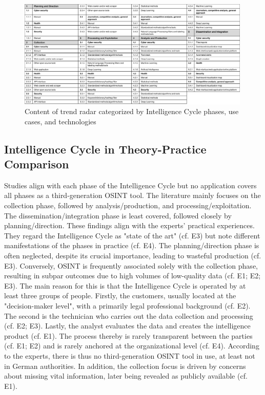 \documentclass[10pt]{article}
\begin{document}
\begin{figure}[thb]
    \centering
    \includegraphics[width=0.99\textwidth]{PDF/images/crop_Trendradar explanation}
    \caption{Content of trend radar categorized by Intelligence Cycle phases, use cases, and technologies}
    \label{fig:trendradarexplanation}
\end{figure}

\subsection{Intelligence Cycle in Theory-Practice Comparison} \label{sec:intcomp}

Studies align with each phase of the Intelligence Cycle but no application covers all phases as a third-generation OSINT tool. The literature mainly focuses on the collection phase, followed by analysis/production, and processing/exploitation. The dissemination/integration phase is least covered, followed closely by planning/direction.
These findings align with the experts' practical experiences. They regard the Intelligence Cycle as "state of the art" (cf. E3) but note different manifestations of the phases in practice (cf. E4).
The planning/direction phase is often neglected, despite its crucial importance, leading to wasteful production (cf. E3). Conversely, OSINT is frequently associated solely with the collection phase,
resulting in subpar outcomes due to high volumes of low-quality data (cf. E1; E2; E3). The main reason for this is that the Intelligence Cycle is operated by at least three groups of people. Firstly, the customers, usually located at the "decision-maker level", with a primarily legal professional background (cf. E2).
The second is the technician who carries out the data collection and processing (cf. E2; E3). Lastly, the analyst evaluates the data and creates the intelligence product (cf. E1). The process thereby is rarely transparent between the parties
(cf. E1; E2) and is rarely anchored at the organizational level (cf. E4). According to the experts, there is thus no third-generation
OSINT tool in use, at least not in German authorities. In addition, the collection focus is driven by concerns about missing vital information, later being revealed as publicly available (cf. E1).
\end{document}
